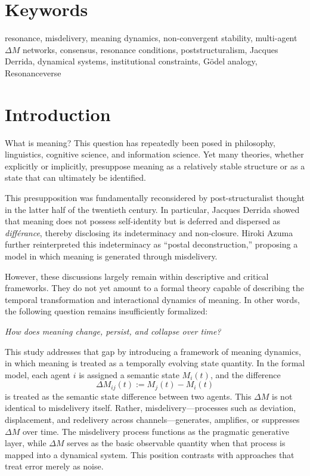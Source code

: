 \documentclass[11pt,a4paper]{article}
\theoremstyle{definition}
\begin{document}
\section*{Keywords}
resonance, misdelivery, meaning dynamics, non-convergent stability, multi-agent $\Delta M$ networks, consensus, resonance conditions, poststructuralism, Jacques Derrida, dynamical systems, institutional constraints, Gödel analogy, Resonanceverse

\section{Introduction}

What is meaning? This question has repeatedly been posed in philosophy, linguistics, cognitive science, and information science. Yet many theories, whether explicitly or implicitly, presuppose meaning as a relatively stable structure or as a state that can ultimately be identified.

This presupposition was fundamentally reconsidered by post-structuralist thought in the latter half of the twentieth century. In particular, Jacques Derrida showed that meaning does not possess self-identity but is deferred and dispersed as \textit{différance}, thereby disclosing its indeterminacy and non-closure. Hiroki Azuma further reinterpreted this indeterminacy as ``postal deconstruction,'' proposing a model in which meaning is generated through misdelivery.

However, these discussions largely remain within descriptive and critical frameworks. They do not yet amount to a formal theory capable of describing the temporal transformation and interactional dynamics of meaning. In other words, the following question remains insufficiently formalized:

\textit{How does meaning change, persist, and collapse over time?}

This study addresses that gap by introducing a framework of meaning dynamics, in which meaning is treated as a temporally evolving state quantity. In the formal model, each agent $i$ is assigned a semantic state $M_i(t)$, and the difference
\[
\Delta M_{ij}(t) := M_j(t) - M_i(t)
\]
is treated as the semantic state difference between two agents. This $\Delta M$ is not identical to misdelivery itself. Rather, misdelivery---processes such as deviation, displacement, and redelivery across channels---generates, amplifies, or suppresses $\Delta M$ over time. The misdelivery process functions as the pragmatic generative layer, while $\Delta M$ serves as the basic observable quantity when that process is mapped into a dynamical system. This position contrasts with approaches that treat error merely as noise.
\end{document}
